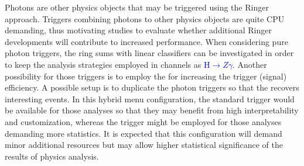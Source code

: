 
Photons are other physics objects that may be triggered using the Ringer approach. Triggers combining photons to other physics objects are quite CPU demanding, thus motivating studies to evaluate whether additional Ringer developments will contribute to increased performance.
When considering pure
photon triggers, the ring sums with linear classifiers can
be investigated in order to keep the analysis strategies employed in channels as
\textcolor{blue}{$\text{H}\rightarrow Z\gamma$}. Another possibility for those triggers is to
employ the \rnn{} for increasing the trigger (signal) efficiency. A possible
setup is to duplicate the photon triggers so that the \rnn{} recovers
interesting events.  In this hybrid menu configuration, the standard trigger
would be available for those analyses so that they may benefit from high
interpretability and customization, whereas the \rnn{} trigger might be employed
for those analyses demanding more statistics. It is expected that this
configuration will demand minor additional resources but may allow higher
statistical significance of the results of physics analysis.





